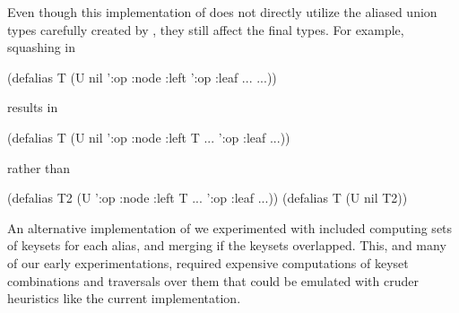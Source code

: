 Even though this implementation of \shouldmergeOp{} does not directly utilize the aliased
union types carefully created by \aliashmap{}, they still affect the final types.
For example, squashing  in
\begin{cljlisting}
(defalias T 
  (U nil
     '{:op :node :left '{:op :leaf ...} ...}))
\end{cljlisting}
results in 
\begin{cljlisting}
(defalias T 
  (U nil
     '{:op :node :left T ...}
     '{:op :leaf ...}))
\end{cljlisting}
rather than
\begin{cljlisting}
(defalias T2 (U '{:op :node :left T ...}
                '{:op :leaf ...}))
(defalias T (U nil T2))
\end{cljlisting}
An alternative implementation of \shouldmergeOp{} we experimented with included computing sets of keysets
for each alias, and merging if the keysets overlapped. This, and many of our early experimentations,
required expensive computations of keyset combinations and traversals over them that could be emulated
with cruder heuristics like the current implementation.


